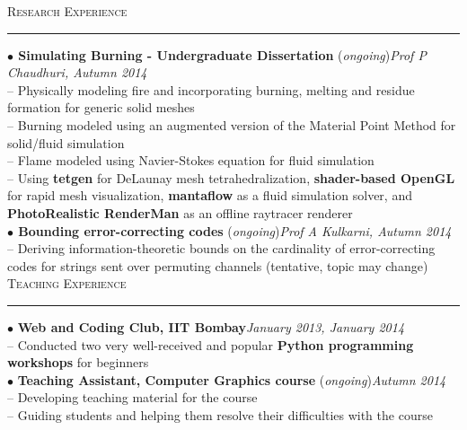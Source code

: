 \documentclass[a4paper,9pt]{article}
\begin{document}
\Large{\textsc{Research Experience}}\vspace{1.5pt}
\hrule\vspace{0.25cm}
\small
\textbf{$\bullet$ Simulating Burning - Undergraduate Dissertation} (\textit{ongoing})\hfill \textit{Prof P Chaudhuri, Autumn 2014}\\
-- Physically modeling fire and incorporating burning, melting and residue formation for generic solid meshes\\
-- Burning modeled using an augmented version of the Material Point Method for solid/fluid simulation\\
-- Flame modeled using Navier-Stokes equation for fluid simulation\\
-- Using \textbf{tetgen} for DeLaunay mesh tetrahedralization, \textbf{shader-based OpenGL} for rapid mesh visualization, \textbf{mantaflow} as a fluid simulation solver, and \textbf{PhotoRealistic RenderMan} as an offline raytracer renderer\\
\textbf{$\bullet$ Bounding error-correcting codes} (\textit{ongoing})\hfill \textit{Prof A Kulkarni, Autumn 2014}\\
-- Deriving information-theoretic bounds on the cardinality of error-correcting codes for strings sent over permuting channels (tentative, topic may change)\\

\Large{\textsc{Teaching Experience}}\vspace{1.5pt}
\hrule\vspace{0.25cm}
\small
$\bullet$ \textbf{Web and Coding Club, IIT Bombay}\hfill \textit{January 2013, January 2014}\\
-- Conducted two very well-received and popular \textbf{Python programming workshops} for beginners\\
$\bullet$ \textbf{Teaching Assistant, Computer Graphics course} (\textit{ongoing})\hfill \textit{Autumn 2014}\\
-- Developing teaching material for the course\\
-- Guiding students and helping them resolve their difficulties with the course\\
\end{document}

